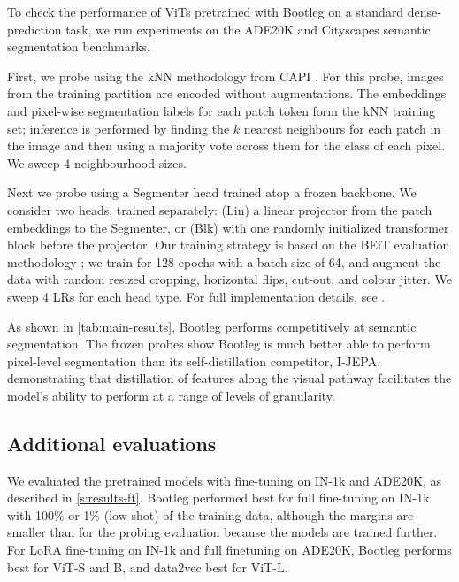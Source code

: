To check the performance of ViTs pretrained with Bootleg on a standard dense-prediction task, we run experiments on the ADE20K \citep{ade20k} and Cityscapes \citep{Cordts2016_Cityscapes} semantic segmentation benchmarks.

First, we probe using the kNN methodology from CAPI \citep{darcet2025capi}.
For this probe, images from the training partition are encoded without augmentations.
The embeddings and pixel-wise segmentation labels for each patch token form the kNN training set; inference is performed by finding the $k$ nearest neighbours for each patch in the image and then using a majority vote across them for the class of each pixel.
We sweep 4 neighbourhood sizes.

Next we probe using a Segmenter \citep{strudel2021segmenter} head trained atop a frozen backbone.
We consider two heads, trained separately: (Lin) a linear projector from the patch embeddings to the Segmenter, or (Blk) with one randomly initialized transformer block before the projector.
Our training strategy is based on the BEiT evaluation methodology \citep{bao2021beit}; we train for 128 epochs with a batch size of 64, and augment the data with random resized cropping, horizontal flips, cut-out, and colour jitter.
We sweep 4 LRs for each head type.
For full implementation details, see \iftoggle{arxiv}{\cref{s:method-semseg}}{the supplementary materials}.



As shown in \cref{tab:main-results}, Bootleg performs competitively at semantic segmentation.
The frozen probes show Bootleg is much better able to perform pixel-level segmentation than its self-distillation competitor, I-JEPA, demonstrating that distillation of features along the visual pathway facilitates the model's ability to perform at a range of levels of granularity.







\subsection{Additional evaluations}

We evaluated the pretrained models with fine-tuning on IN-1k and ADE20K, as described in \cref{s:results-ft}.
Bootleg performed best for full fine-tuning on IN-1k with 100\% or 1\% (low-shot) of the training data, although the margins are smaller than for the probing evaluation because the models are trained further.
For LoRA fine-tuning on IN-1k and full finetuning on ADE20K, Bootleg performs best for ViT-S and B, and data2vec best for ViT-L.

